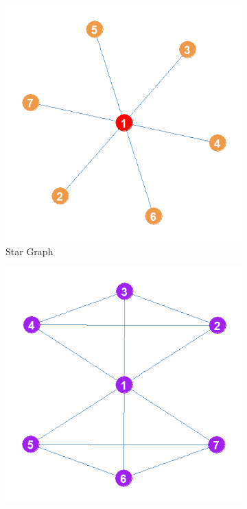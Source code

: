 \documentclass[12pt]{article}
\begin{document}
\begin{figure}
    \captionsetup[subfigure]{font=footnotesize,labelfont=footnotesize}
    \centering
     \begin{subfigure}[b]{0.35\textwidth}
        \includegraphics[width=1.0\textwidth]{Plots/Toys/star.png}
            \caption{Star Graph}
            \label{fig:star}
    \end{subfigure}
     \begin{subfigure}[b]{0.35\textwidth}
        \includegraphics[width=1.0\textwidth]{Plots/Toys/sf.png}

\end{subfigure}
\end{figure}
\end{document}
